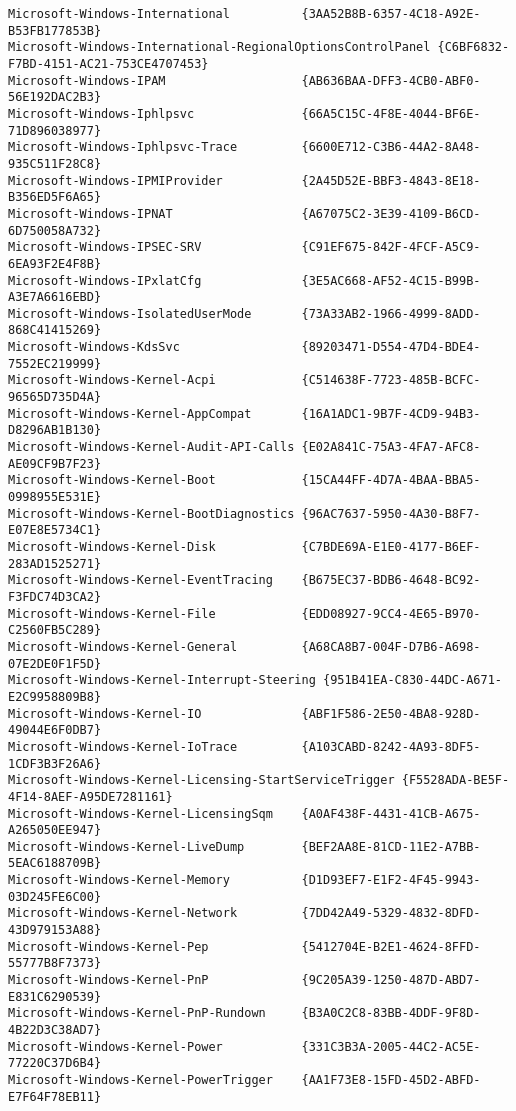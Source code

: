 \documentclass{report}
\begin{document}
\begin{lstlisting}[breaklines=true,basicstyle=\tiny]
Microsoft-Windows-International          {3AA52B8B-6357-4C18-A92E-B53FB177853B}
Microsoft-Windows-International-RegionalOptionsControlPanel {C6BF6832-F7BD-4151-AC21-753CE4707453}
Microsoft-Windows-IPAM                   {AB636BAA-DFF3-4CB0-ABF0-56E192DAC2B3}
Microsoft-Windows-Iphlpsvc               {66A5C15C-4F8E-4044-BF6E-71D896038977}
Microsoft-Windows-Iphlpsvc-Trace         {6600E712-C3B6-44A2-8A48-935C511F28C8}
Microsoft-Windows-IPMIProvider           {2A45D52E-BBF3-4843-8E18-B356ED5F6A65}
Microsoft-Windows-IPNAT                  {A67075C2-3E39-4109-B6CD-6D750058A732}
Microsoft-Windows-IPSEC-SRV              {C91EF675-842F-4FCF-A5C9-6EA93F2E4F8B}
Microsoft-Windows-IPxlatCfg              {3E5AC668-AF52-4C15-B99B-A3E7A6616EBD}
Microsoft-Windows-IsolatedUserMode       {73A33AB2-1966-4999-8ADD-868C41415269}
Microsoft-Windows-KdsSvc                 {89203471-D554-47D4-BDE4-7552EC219999}
Microsoft-Windows-Kernel-Acpi            {C514638F-7723-485B-BCFC-96565D735D4A}
Microsoft-Windows-Kernel-AppCompat       {16A1ADC1-9B7F-4CD9-94B3-D8296AB1B130}
Microsoft-Windows-Kernel-Audit-API-Calls {E02A841C-75A3-4FA7-AFC8-AE09CF9B7F23}
Microsoft-Windows-Kernel-Boot            {15CA44FF-4D7A-4BAA-BBA5-0998955E531E}
Microsoft-Windows-Kernel-BootDiagnostics {96AC7637-5950-4A30-B8F7-E07E8E5734C1}
Microsoft-Windows-Kernel-Disk            {C7BDE69A-E1E0-4177-B6EF-283AD1525271}
Microsoft-Windows-Kernel-EventTracing    {B675EC37-BDB6-4648-BC92-F3FDC74D3CA2}
Microsoft-Windows-Kernel-File            {EDD08927-9CC4-4E65-B970-C2560FB5C289}
Microsoft-Windows-Kernel-General         {A68CA8B7-004F-D7B6-A698-07E2DE0F1F5D}
Microsoft-Windows-Kernel-Interrupt-Steering {951B41EA-C830-44DC-A671-E2C9958809B8}
Microsoft-Windows-Kernel-IO              {ABF1F586-2E50-4BA8-928D-49044E6F0DB7}
Microsoft-Windows-Kernel-IoTrace         {A103CABD-8242-4A93-8DF5-1CDF3B3F26A6}
Microsoft-Windows-Kernel-Licensing-StartServiceTrigger {F5528ADA-BE5F-4F14-8AEF-A95DE7281161}
Microsoft-Windows-Kernel-LicensingSqm    {A0AF438F-4431-41CB-A675-A265050EE947}
Microsoft-Windows-Kernel-LiveDump        {BEF2AA8E-81CD-11E2-A7BB-5EAC6188709B}
Microsoft-Windows-Kernel-Memory          {D1D93EF7-E1F2-4F45-9943-03D245FE6C00}
Microsoft-Windows-Kernel-Network         {7DD42A49-5329-4832-8DFD-43D979153A88}
Microsoft-Windows-Kernel-Pep             {5412704E-B2E1-4624-8FFD-55777B8F7373}
Microsoft-Windows-Kernel-PnP             {9C205A39-1250-487D-ABD7-E831C6290539}
Microsoft-Windows-Kernel-PnP-Rundown     {B3A0C2C8-83BB-4DDF-9F8D-4B22D3C38AD7}
Microsoft-Windows-Kernel-Power           {331C3B3A-2005-44C2-AC5E-77220C37D6B4}
Microsoft-Windows-Kernel-PowerTrigger    {AA1F73E8-15FD-45D2-ABFD-E7F64F78EB11}

\end{lstlisting}
\end{document}

